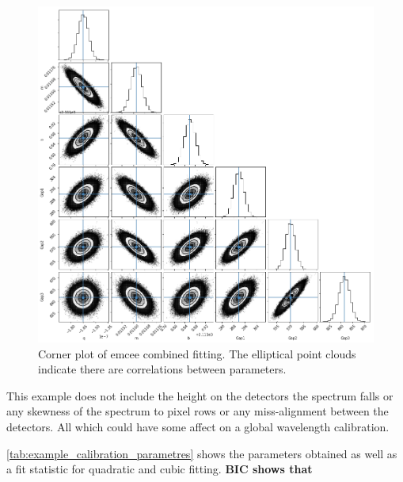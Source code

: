 \begin{figure}
    \centering
    \includegraphics[width=0.5\linewidth]{./figures/appendix/multidetecot_param_fit}
    \caption[Multi-detector parameter correlations.]{Corner plot of emcee combined fitting.
    The elliptical point clouds indicate there are correlations between parameters.}
    \label{fig:multidetecotparamfit}
\end{figure}

This example does not include the height on the detectors the spectrum falls or any skewness of the spectrum to pixel rows or any miss-alignment between the detectors. All which could have some affect on a global wavelength calibration.

\cref{tab:example_calibration_parametres} shows the parameters obtained as well as a fit statistic for quadratic and cubic fitting. \textbf{BIC shows that}

